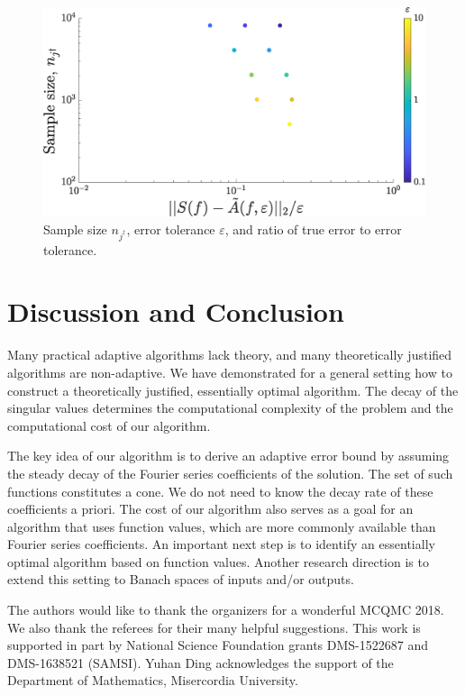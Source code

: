 \documentclass[graybox,footinfo]{svmult}
\begin{document}
\begin{figure}[ht]
 	\centering
 		\includegraphics[width =7.5 cm]{ProgramsImages/SimFourCoefErr.eps}
 	\caption{Sample size $n_{j^{\dagger}}$, error tolerance $\varepsilon$, and ratio of true error to error tolerance. \label{errfig}} %
 \end{figure}

\section{Discussion and Conclusion} \label{sec:conc}
Many practical adaptive algorithms lack theory, and many theoretically justified algorithms are non-adaptive.  We have demonstrated for a general setting how to construct a theoretically justified, essentially optimal algorithm.  The decay of the singular values determines the computational complexity of the problem and the computational cost of our algorithm.  

The key idea of our algorithm is to derive an adaptive error bound by assuming the steady decay of the Fourier series coefficients of the solution.  The set of such functions constitutes a cone.  We do not need to know the decay rate of these coefficients a priori.  The cost of our algorithm also serves as a goal for an algorithm that uses function values, which are more commonly available than Fourier series coefficients.  An important next step is to identify an essentially optimal algorithm based on function values.  Another research direction is to extend this setting to Banach spaces of inputs and/or outputs.

\begin{acknowledgement}
The authors would like to thank the organizers for a wonderful MCQMC 2018. 
We also thank the referees for their many helpful suggestions.  This work is supported in part by National Science Foundation grants DMS-1522687 and DMS-1638521 (SAMSI).  Yuhan Ding acknowledges the support of the Department of Mathematics, Misercordia University.


\end{acknowledgement}



\end{document}
